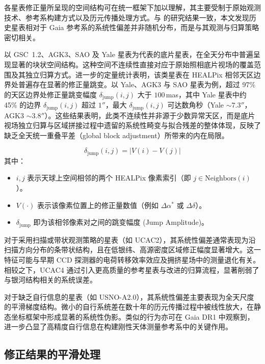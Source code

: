 \documentclass{aastex701}
\begin{document}
各星表修正量所呈现的空间结构可在统一框架下加以理解，其主要受制于原始观测技术、参考系构建方式以及历元传播处理方式。与 \citet{Eggl2020Icarus} 的研究结果一致，本文发现历史星表相对于 Gaia 参考系的系统性偏差并非随机分布，而是与其观测与归算策略密切相关。

以 GSC~1.2、AGK3、SAO 及 Yale 星表为代表的底片星表，在全天分布中普遍呈现显著的块状空间结构。这种空间不连续性直接对应于原始照相底片视场的覆盖范围及其独立归算方式。进一步的定量统计表明，该类星表在 HEALPix 相邻天区边界处普遍存在显著的修正量跳变。以 Yale、AGK3 与 SAO 星表为例，超过 97\% 的天区边界处修正量跳变幅度 $\delta_{\text{jump}} (i, j)$ 大于 $100$\,mas，其中 Yale 星表中约 45\% 的边界 $\delta_{\text{jump}} (i, j)$ 超过 $1''$，最大 $\delta_{\text{jump}} (i, j)$ 可达数角秒（Yale $\sim7.3''$，AGK3 $\sim3.8''$）。这些结果表明，此类不连续性并非源于少数异常天区，而是底片视场独立归算与区域拼接过程中遗留的系统性畸变与拟合残差的整体体现，反映了缺乏全天统一重叠平差（global block adjustment）所带来的内在局限。

\begin{equation}
\delta_{\text{jump}} (i, j) = \left| V(i) - V(j) \right|
\end{equation}
其中：
\begin{itemize}
\item $i, j$ 表示天球上空间相邻的两个 HEALPix 像素索引（即 $j \in \text{Neighbors}(i)$）。
\item $V(\cdot)$ 表示该像素位置上的修正量数值（例如 $\Delta\alpha^*$ 或 $\Delta\delta$）。
\item $\delta_{\text{jump}}$ 即为该相邻像素对之间的跳变幅度 (Jump Amplitude)。
\end{itemize}

对于采用扫描或带状观测策略的星表（如 UCAC2），其系统性偏差通常表现为沿扫描方向分布的条带状结构，且在低银纬、高源密度区域修正幅度显著增大。这一特征可能与早期 CCD 探测器的电荷转移效率效应及拥挤星场中的测量退化有关。相较之下，UCAC4 通过引入更高质量的参考星表与改进的归算流程，显著削弱了与银河结构相关的系统误差。

对于缺乏自行信息的星表（如 USNO-A2.0），其系统性偏差主要表现为全天尺度的平滑梯度结构。微小的自行系统差在数十年的历元传播过程中被线性放大，在静态坐标框架中形成显著的系统性伪影。类似的行为亦可在 Gaia DR1 中观察到，进一步凸显了高精度自行信息在构建刚性天体测量参考系中的关键作用。

\subsection{修正结果的平滑处理} \label{subsec:smoothing}
\end{document}
